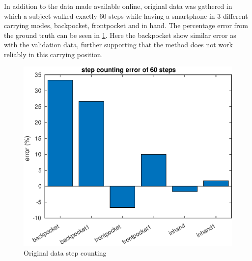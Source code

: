 In addition to the data made available online, original data was gathered in which a subject walked exactly 60 steps while having a smartphone in 3 different carrying modes, backpocket, frontpocket and in hand. The percentage error from the ground truth can be seen in \cref{fig:202009291013step_counting_error_of_60_steps}. Here the backpocket show similar error as with the validation data, further supporting that the method does not work reliably in this carrying position.
\begin{figure}[H]
	\centering
	\includegraphics[width=0.55\linewidth]{images/20200929_1013_step_counting_error_of_60_steps}
	\caption{Original data step counting}
	\label{fig:202009291013step_counting_error_of_60_steps}
\end{figure}

